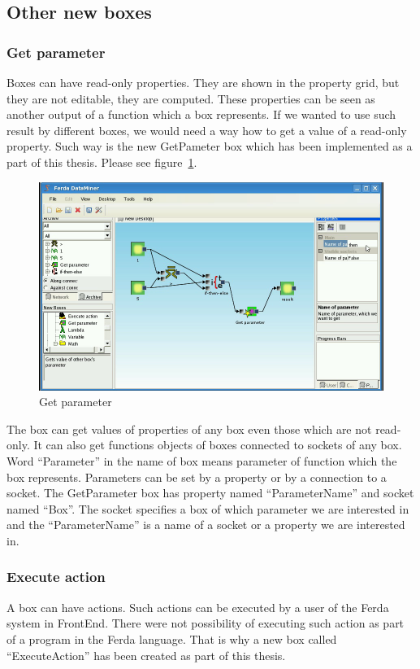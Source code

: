 \documentclass[a4paper,12pt]{book}
\begin{document}
\subsection{Other new boxes}
\subsubsection{Get parameter}
Boxes can have read-only properties. They are shown in the property grid, but they are not editable, they are computed. These properties can be seen as another output of a function which a box represents. If we wanted to use such result by different boxes, we would need a way how to get a value of a read-only property. Such way is the new GetPameter box which has been implemented as a part of this thesis. Please see figure~\ref{fig:boxGetParameter}.

\begin{figure}
	\includegraphics[width=1\textwidth]{getParameter2.png}
	\caption{Get parameter}
	\label{fig:boxGetParameter}
\end{figure}

The box can get values of properties of any box even those which are not read-only. It can also get functions objects of boxes connected to sockets of any box. Word ``Parameter'' in the name of box means parameter of function which the box represents. Parameters can be set by a property or by a connection to a socket. The GetParameter box has property named ``ParameterName'' and socket named ``Box''. The socket specifies a box of which parameter we are interested in and the ``ParameterName'' is a name of a socket or a property we are interested in.

\subsubsection{Execute action}
A box can have actions. Such actions can be executed by a user of the Ferda system in FrontEnd. There were not possibility of executing such action as part of a program in the Ferda language. That is why a new box called ``ExecuteAction'' has been created as part of this thesis.
\end{document}
